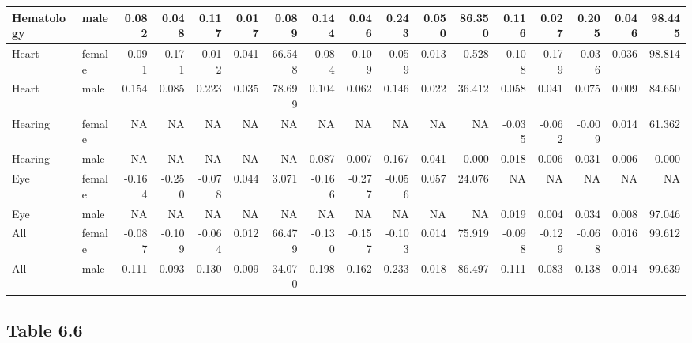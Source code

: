 \documentclass[]{article}
\newenvironment{Shaded}{\begin{snugshade}}{\end{snugshade}}
\newcommand{\CommentTok}[1]{\textcolor[rgb]{0.56,0.35,0.01}{\textit{#1}}}
\begin{document}
\begin{table}
\begin{tabular}[t]{l|l|r|r|r|r|r|r|r|r|r|r|r|r|r|r|r}
\hline
Hematology & male & 0.082 & 0.048 & 0.117 & 0.017 & 0.089 & 0.144 & 0.046 & 0.243 & 0.050 & 86.350 & 0.116 & 0.027 & 0.205 & 0.046 & 98.445\\
\hline
Heart & female & -0.091 & -0.171 & -0.012 & 0.041 & 66.548 & -0.084 & -0.109 & -0.059 & 0.013 & 0.528 & -0.108 & -0.179 & -0.036 & 0.036 & 98.814\\
\hline
Heart & male & 0.154 & 0.085 & 0.223 & 0.035 & 78.699 & 0.104 & 0.062 & 0.146 & 0.022 & 36.412 & 0.058 & 0.041 & 0.075 & 0.009 & 84.650\\
\hline
Hearing & female & NA & NA & NA & NA & NA & NA & NA & NA & NA & NA & -0.035 & -0.062 & -0.009 & 0.014 & 61.362\\
\hline
Hearing & male & NA & NA & NA & NA & NA & 0.087 & 0.007 & 0.167 & 0.041 & 0.000 & 0.018 & 0.006 & 0.031 & 0.006 & 0.000\\
\hline
Eye & female & -0.164 & -0.250 & -0.078 & 0.044 & 3.071 & -0.166 & -0.277 & -0.056 & 0.057 & 24.076 & NA & NA & NA & NA & NA\\
\hline
Eye & male & NA & NA & NA & NA & NA & NA & NA & NA & NA & NA & 0.019 & 0.004 & 0.034 & 0.008 & 97.046\\
\hline
All & female & -0.087 & -0.109 & -0.064 & 0.012 & 66.479 & -0.130 & -0.157 & -0.103 & 0.014 & 75.919 & -0.098 & -0.129 & -0.068 & 0.016 & 99.612\\
\hline
All & male & 0.111 & 0.093 & 0.130 & 0.009 & 34.070 & 0.198 & 0.162 & 0.233 & 0.018 & 86.497 & 0.111 & 0.083 & 0.138 & 0.014 & 99.639\\
\hline
\end{tabular}
\end{table}

\begin{Shaded}
\end{Shaded}

\hypertarget{table-6.6}{%
\subsection{Table 6.6}\label{table-6.6}}
\end{document}
